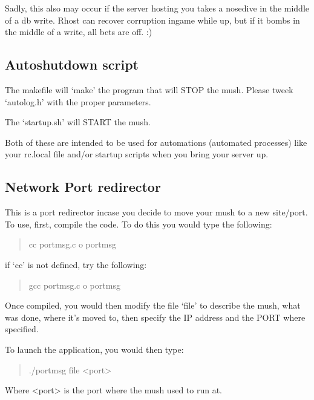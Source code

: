 \documentclass[letterpaper,10pt,english]{sphinxmanual}
\begin{document}
\sphinxAtStartPar
Sadly, this also may occur if the server hosting you takes a nose\sphinxhyphen{}dive in the middle
of a db write.  Rhost can recover corruption in\sphinxhyphen{}game while up, but if it bombs
in the middle of a write, all bets are off. :)


\subsection{Autoshutdown script}
\label{\detokenize{maintenance:autoshutdown-script}}
\sphinxAtStartPar
The makefile will ‘make’ the program that will STOP the mush.
Please tweek ‘autolog.h’ with the proper parameters.

\sphinxAtStartPar
The ‘startup.sh’ will START the mush.

\sphinxAtStartPar
Both of these are intended to be used for automations (automated processes)
like your rc.local file and/or startup scripts when you bring your server up.


\subsection{Network Port redirector}
\label{\detokenize{maintenance:network-port-redirector}}
\sphinxAtStartPar
This is a port redirector incase you decide to move your mush
to a new site/port.  To use, first, compile the code.  To do
this you would type the following:
\begin{quote}

\sphinxAtStartPar
cc portmsg.c \sphinxhyphen{}o portmsg
\end{quote}

\sphinxAtStartPar
if ‘cc’ is not defined, try the following:
\begin{quote}

\sphinxAtStartPar
gcc portmsg.c \sphinxhyphen{}o portmsg
\end{quote}

\sphinxAtStartPar
Once compiled, you would then modify the file ‘file’ to describe
the mush, what was done, where it’s moved to, then specify the
IP address and the PORT where specified.

\sphinxAtStartPar
To launch the application, you would then type:
\begin{quote}

\sphinxAtStartPar
./portmsg file \textless{}port\textgreater{}
\end{quote}

\sphinxAtStartPar
Where \textless{}port\textgreater{} is the port where the mush used to run at.
\end{document}
